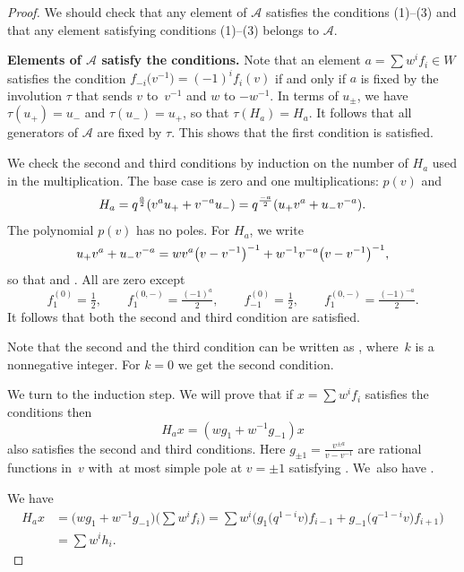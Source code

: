 \documentclass[pdftex]{sigma}
\newcommand{\mc}{\mathcal}
\numberwithin{equation}{section}
\theoremstyle{definition}
\begin{document}
\begin{proof}
We should check that any element of $\mc{A}$ satisfies the conditions (1)--(3) and that any element satisfying conditions (1)--(3) belongs to $\mc{A}$.

 {\bf Elements of $\mc{A}$ satisfy the conditions.}
 Note that an element $a=\sum w^i f_i\in W$ satisfies the condition $f_{-i}\bigl(v^{-1}\bigr)=(-1)^i f_i(v)$ if and only if $a$ is fixed by the involution $\tau$ that sends $v$ to~$v^{-1}$ and $w$ to $-w^{-1}$. In terms of $u_{\pm}$, we have $\tau(u_+)=u_-$ and $\tau(u_-)=u_+$, so that $\tau(H_a)=H_a$. It follows that all generators of $\mc{A}$ are fixed by $\tau$. This shows that the first condition is satisfied.

 We check the second and third conditions by induction on the number of $H_a$ used in the multiplication. The base case is zero and one multiplications: $p(v)$ and \[
 H_a=q^{\frac{a}{2}}(v^au_+ + v^{-a}u_-)=\smash{q^{\frac{-a}{2}}(u_+v^a+u_-v^{-a})}.\]
 The polynomial $p(v)$ has no poles. For $H_a$, we write
 \[
 u_+v^a+u_-v^{-a}=\smash{wv^a\bigl(v-v^{-1}\bigr)^{-1}+w^{-1}v^{-a}\bigl(v-v^{-1}\bigr)^{-1}},
 \]
 so that  and . All  are zero except
 \[
 f_1^{(0)}=\tfrac{1}{2} , \qquad f_1^{(0,-)}=\tfrac{(-1)^a}{2} , \qquad f_{-1}^{(0)}=\tfrac{1}{2} , \qquad f_1^{(0,-)}=\tfrac{(-1)^{-a}}{2}.
 \]
 It follows that both the second and third condition are satisfied.

Note that the second and the third condition can be written as , where~$k$ is a nonnegative integer. For $k=0$ we get the second condition.

We turn to the induction step. We will prove that if $x=\sum w^i f_i$ satisfies the conditions then
\[
H_ax=(wg_1+w^{-1}g_{-1})x
\] also satisfies the second and third conditions. Here $g_{\pm 1}=\frac{v^{\pm a}}{v-v^{-1}}$ are rational functions in~$v$ with~at most simple pole at $v=\pm 1$ satisfying . We~also have .

We have
\begin{align}
 H_ax&=\bigl(wg_1+w^{-1}g_{-1}\bigr)\Big(\sum w^i f_i\Big)=\sum w^i \bigl(g_1\bigl(q^{1-i}v\bigr)f_{i-1}+g_{-1}\bigl(q^{-1-i}v\bigr)f_{i+1}\bigr)\nonumber\\
 &=\sum w^i h_i. \label{EqHax}
\end{align}


\end{proof}
\end{document}
